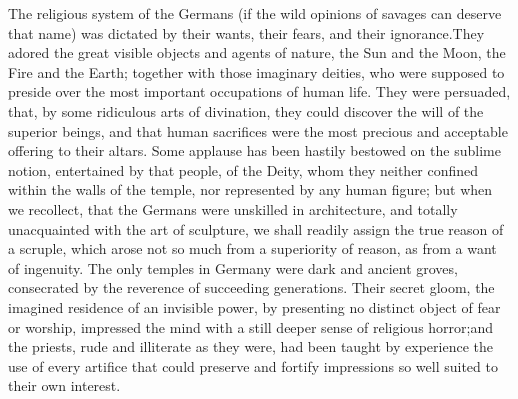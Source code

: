 




The religious system of the Germans (if the wild opinions of
savages can deserve that name) was dictated by their wants, their
fears, and their ignorance.\footnotemark[62] They adored the great visible
objects and agents of nature, the Sun and the Moon, the Fire and
the Earth; together with those imaginary deities, who were
supposed to preside over the most important occupations of human
life. They were persuaded, that, by some ridiculous arts of
divination, they could discover the will of the superior beings,
and that human sacrifices were the most precious and acceptable
offering to their altars. Some applause has been hastily bestowed
on the sublime notion, entertained by that people, of the Deity,
whom they neither confined within the walls of the temple, nor
represented by any human figure; but when we recollect, that the
Germans were unskilled in architecture, and totally unacquainted
with the art of sculpture, we shall readily assign the true
reason of a scruple, which arose not so much from a superiority
of reason, as from a want of ingenuity. The only temples in
Germany were dark and ancient groves, consecrated by the
reverence of succeeding generations. Their secret gloom, the
imagined residence of an invisible power, by presenting no
distinct object of fear or worship, impressed the mind with a
still deeper sense of religious horror;\footnotemark[63] and the priests, rude
and illiterate as they were, had been taught by experience the
use of every artifice that could preserve and fortify impressions
so well suited to their own interest.


